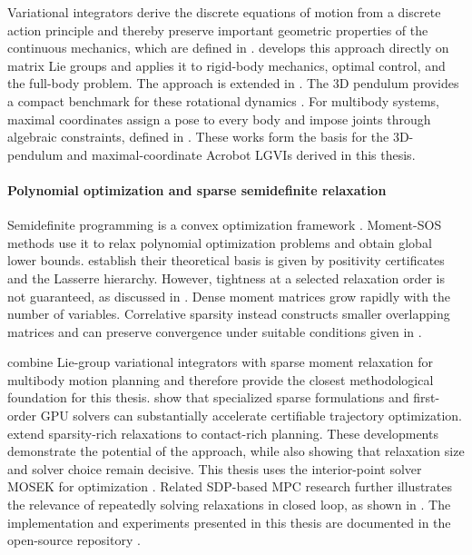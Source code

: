 Variational integrators derive the discrete equations of motion from a discrete
action principle and thereby preserve important geometric properties of the
continuous mechanics, which are defined in \cite{Marsden2001}. 
\cite{Lee2008} develops this approach directly on
matrix Lie groups and applies it to rigid-body mechanics, optimal control, and the
full-body problem. The approach is extended in
\cite{Lee2007,LeeLeokMcClamroch2007DiscreteControlSystems}. The 3D pendulum
provides a compact benchmark for these rotational dynamics \cite{Shen20043DPendulum}.
For multibody systems, maximal coordinates assign a pose to every body and impose
joints through algebraic constraints, defined in 
\cite{BrudigamManchester2021VariationalIntegrators,BrudigamManchester2021LQR}.
These works form the basis for the 3D-pendulum and maximal-coordinate Acrobot LGVIs
derived in this thesis.

\paragraph{Polynomial optimization and sparse semidefinite relaxation}

Semidefinite programming is a convex optimization framework
\cite{VandenbergheBoyd1996SDP}. Moment-SOS methods use it to relax polynomial
optimization problems and obtain global lower bounds. 
\cite{Putinar1993Positive,Lasserre2001Global,Yang2024Semidefinite} establish their 
theoretical basis is
given by positivity certificates and the Lasserre hierarchy. However,
tightness at a selected relaxation order is not guaranteed, as discussed in
\cite{Nie2014FiniteConvergence}. Dense moment matrices grow rapidly with the number
of variables. Correlative sparsity instead constructs smaller overlapping matrices
and can preserve convergence under suitable conditions given in
\cite{Waki2006Sparse,Lasserre2006Sparse}.

\cite{Sangli2025} combine Lie-group variational integrators with sparse moment relaxation
for multibody motion planning and therefore provide the closest methodological
foundation for this thesis. \cite{Kang_2026Fast} show that specialized
sparse formulations and first-order GPU solvers can substantially accelerate
certifiable trajectory optimization. \cite{Kang_2025Global} extend sparsity-rich
relaxations to contact-rich planning. These developments
demonstrate the potential of the approach, while also showing that relaxation size
and solver choice remain decisive. This thesis uses the interior-point solver MOSEK
for optimization \cite{MOSEK}.
Related SDP-based MPC research further illustrates the relevance of repeatedly
solving relaxations in closed loop, as shown in \cite{Hartmann_2026SDP}. The implementation and
experiments presented in this thesis are documented in the open-source
repository \cite{Elshani2026CTO_GitHub}.

